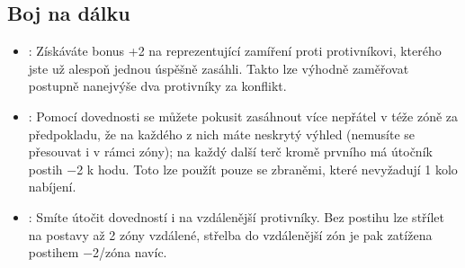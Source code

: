 \documentclass[../main.tex]{subfiles}
\begin{document}
\subsection{Boj na dálku}
\label{sec:trik-bnd}
\begin{itemize}
\item{}:
\label{sec:bnd-jeden_terc}
Získáváte bonus +2 na  reprezentující zamíření proti protivníkovi, kterého jste už alespoň jednou úspěšně zasáhli. Takto lze výhodně zaměřovat postupně nanejvýše dva protivníky za konflikt.

\item{}:
\label{sec:bnd-mnohonasobny}
Pomocí dovednosti  se můžete pokusit zasáhnout více nepřátel v téže zóně za předpokladu, že na každého z nich máte neskrytý výhled (nemusíte se přesouvat i v rámci zóny); na každý další terč kromě prvního má útočník postih −2 k hodu. Toto lze použít pouze se zbraněmi, které nevyžadují 1 kolo nabíjení.

\item {}:
\label{sec:bnd-odstrelovac}
Smíte útočit dovedností  i na vzdálenější protivníky. Bez postihu lze střílet na postavy až 2 zóny vzdálené, střelba do vzdálenější zón je pak zatížena postihem −2/zóna navíc. 

\end{itemize}
  
\end{document}
